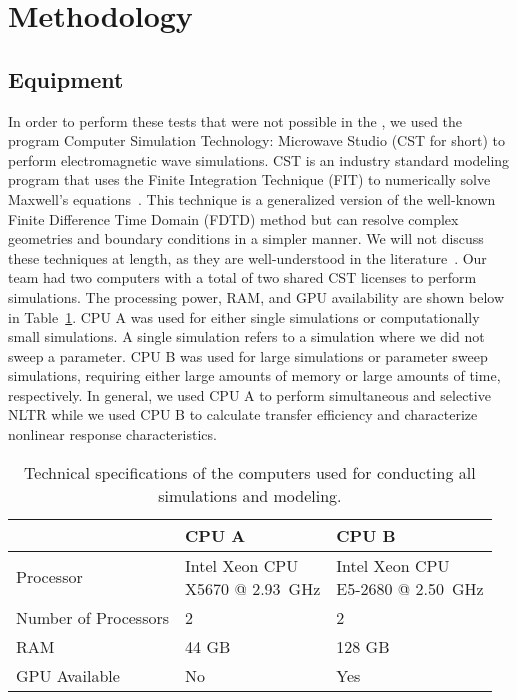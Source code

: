 \section{Methodology}
\label{sec:numerical-meth}

\subsection{Equipment}
In order to perform these tests that were not possible in the \giga{}, we used the program Computer Simulation Technology: Microwave Studio (CST for short) to perform electromagnetic wave simulations. CST is an industry standard modeling program that uses the Finite Integration Technique (FIT) to numerically solve Maxwell's equations~\cite{computersimulationtechnology}. This technique is a generalized version of the well-known Finite Difference Time Domain (FDTD) method but can resolve complex geometries and boundary conditions in a simpler manner. We will not discuss these techniques at length, as they are well-understood in the literature~\cite{schneider2010understanding,weiland2001discrete}.
Our team had two computers with a total of two shared CST licenses to perform simulations. The processing power, RAM, and GPU availability are shown below in Table~\ref{tab:numerical-cpu-specs}. CPU A was used for either single simulations or computationally small simulations. A single simulation refers to a simulation where we did not sweep a parameter.  CPU B was used for large simulations or parameter sweep simulations, requiring either large amounts of memory or large amounts of time, respectively. In general, we used CPU A to perform simultaneous and selective NLTR while we used CPU B to calculate transfer efficiency and characterize nonlinear response characteristics.

\def\arraystretch{2}
\begin{table}[h]
\centering
\begin{tabular}{|l|l|l|}
\hline
 & \textbf{CPU A} & \textbf{CPU B} \\ \hline
Processor & \rule{0pt}{2.5em}\shortstack{Intel Xeon CPU \\ X5670 @ 2.93~GHz} & \rule{0pt}{2.5em}\shortstack{Intel Xeon CPU \\ E5-2680 @ 2.50~GHz} \\ \hline
Number of Processors & 2 & 2 \\ \hline
RAM & 44 GB & 128 GB \\ \hline
GPU Available & No & Yes \\ \hline
\end{tabular}
\caption[Computer specifications]{Technical specifications of the computers used for conducting all simulations and modeling.}
\label{tab:numerical-cpu-specs}
\end{table}

